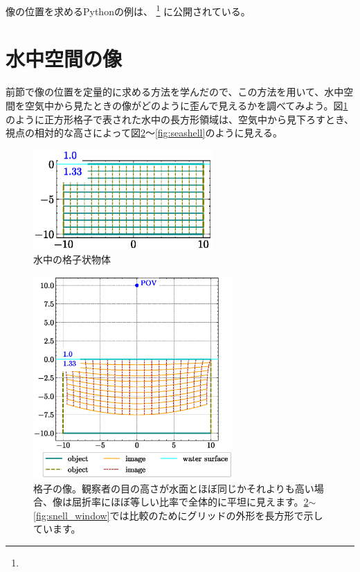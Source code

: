 \documentclass[twocolumn]{article}
\begin{document}
像の位置を求めるPythonの例は、
\href{https://github.com/mingshey/python_projects/blob/main/Refraction_Image_en.ipynb}%
{}\footnote{} に公開されている。

\section{水中空間の像}

前節で像の位置を定量的に求める方法を学んだので、この方法を用いて、水中空間を空気中から見たときの像がどのように歪んで見えるかを調べてみよう。図\ref{fig:grid_underwater}のように正方形格子で表された水中の長方形領域は、空気中から見下ろすとき、視点の相対的な高さによって図\ref{fig:image_underwater}〜\ref{fig:seashell}のように見える。

\begin{figure}[!h]
	\centering
	\includegraphics[width=2.7in]{figs/grid_underwater.eps}
	\caption{水中の格子状物体}
	\label{fig:grid_underwater}
\end{figure}

\begin{figure}[!t]
	\centering
	\includegraphics[width=3in]{figs/image_underwater1.eps}
	\caption{格子の像。観察者の目の高さが水面とほぼ同じかそれよりも高い場合、像は屈折率にほぼ等しい比率で全体的に平坦に見えます。\ref{fig:image_underwater}$\sim$\ref{fig:snell_window}では比較のためにグリッドの外形を長方形で示しています。}
	\label{fig:image_underwater}
\end{figure}
\end{document}
